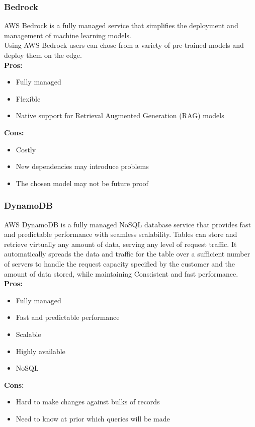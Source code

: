         \subsubsection{Bedrock}
        \label{aws:bedrock}
        AWS Bedrock is a fully managed service that simplifies the deployment and management of machine learning models.\\
        Using AWS Bedrock users can chose from a variety of pre-trained models and deploy them on the edge.\\
        \textbf{Pros:}
        \begin{itemize}
            \item Fully managed
            \item Flexible
            \item Native support for Retrieval Augmented Generation (RAG) models
        \end{itemize}
        \textbf{Cons:}
        \begin{itemize}
            \item Costly
            \item New dependencies may introduce problems
            \item The chosen model may not be future proof
        \end{itemize}

        \subsubsection{DynamoDB}
        \label{aws:dynamodb}
        AWS DynamoDB is a fully managed NoSQL database service that provides fast and predictable performance with seamless scalability.
        Tables can store and retrieve virtually any amount of data, serving any level of request traffic.
        It automatically spreads the data and traffic for the table over a sufficient number of servers to handle the request capacity specified by the customer and the amount of data stored, while maintaining Cons:istent and fast performance.\\
        \textbf{Pros:}
        \begin{itemize}
            \item Fully managed
            \item Fast and predictable performance
            \item Scalable
            \item Highly available
            \item NoSQL
        \end{itemize}
        \textbf{Cons:}
        \begin{itemize}
            \item Hard to make changes against bulks of records
            \item Need to know at prior which queries will be made
        \end{itemize}

